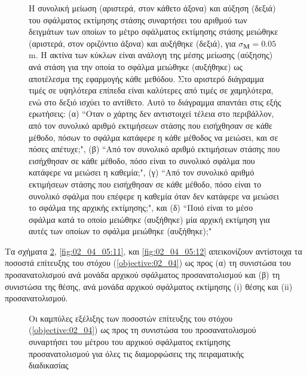 \begin{figure}[!h]\vspace{3cm}%
  
  \vspace{1cm}
  \caption{\small Η συνολική μείωση (αριστερά, στον κάθετο άξονα) και αύξηση
           (δεξιά) του σφάλματος εκτίμησης στάσης συναρτήσει του αριθμού των
           δειγμάτων των οποίων το μέτρο σφάλματος εκτίμησης στάσης μειώθηκε
           (αριστερά, στον οριζόντιο άξονα) και αυξήθηκε (δεξιά), για
           $\sigma_{\bm{M}} = 0.05$ m. Η ακτίνα των κύκλων είναι ανάλογη της
           μέσης μείωσης (αύξησης) ανά στάση για την οποία το σφάλμα μειώθηκε
           (αυξήθηκε) ως αποτέλεσμα της εφαρμογής κάθε μεθόδου. Στο αριστερό
           διάγραμμα τιμές σε υψηλότερα επίπεδα είναι καλύτερες από τιμές σε
           χαμηλότερα, ενώ στο δεξιό ισχύει το αντίθετο. Αυτό το
           διάγραμμα απαντάει στις εξής ερωτήσεις: (α) ``Oταν ο χάρτης δεν
           αντιστοιχεί τέλεια στο περιβάλλον, από τον συνολικό αριθμό
           εκτιμήσεων στάσης που εισήχθησαν σε κάθε μέθοδο, πόσων το σφάλμα
           κατάφερε η κάθε μέθοδος να μειώσει, και σε πόσες απέτυχε;", (β)
           ``Από τον συνολικό αριθμό εκτιμήσεων στάσης που εισήχθησαν σε κάθε
           μέθοδο, πόσο είναι το συνολικό σφάλμα που κατάφερε να μειώσει η
           καθεμία;", (γ) ``Από τον συνολικό αριθμό εκτιμήσεων στάσης που
           εισήχθησαν σε κάθε μέθοδο, πόσο είναι το συνολικό σφάλμα που επέφερε
           η καθεμία όταν δεν κατάφερε να μειώσει το σφάλμα της αρχικής
           εκτίμησης;", και (δ) ``Ποιό είναι το μέσο σφάλμα κατά το οποίο
           μειώθηκε (αυξήθηκε) μία αρχική εκτίμηση για αυτές των οποίων το
           σφάλμα μειώθηκε (αυξήθηκε);"}
  \label{fig:02_04_05:01_circles_sm5}
\end{figure}

Τα σχήματα \ref{fig:02_04_05:10}, \ref{fig:02_04_05:11}, και
\ref{fig:02_04_05:12} απεικονίζουν αντίστοιχα τα ποσοστά επίτευξης του στόχου
(\ref{objective:02_04}) ως προς (α) τη συνιστώσα του προσανατολισμού ανά μονάδα
αρχικού σφάλματος προσανατολισμού και (β) τη συνιστώσα της θέσης, ανά μονάδα
αρχικού σφάλματος εκτίμησης (i) θέσης και (ii) προσανατολισμού.

\begin{figure}[!h]\centering
  \vspace{2cm}
  
  \vspace{1.5cm}
  \caption{\small Οι καμπύλες εξέλιξης των ποσοστών επίτευξης του στόχου
           (\ref{objective:02_04}) ως προς τη συνιστώσα του προσανατολισμού
           συναρτήσει του μέτρου του αρχικού σφάλματος εκτίμησης
           προσανατολισμού για όλες τις διαμορφώσεις της πειραματικής
           διαδικασίας}
  \label{fig:02_04_05:10}
\end{figure}

